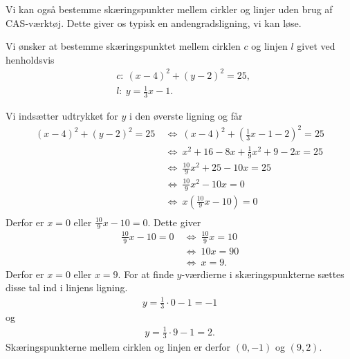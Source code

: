 \documentclass[12pt]{article}
\begin{document}
Vi kan også bestemme skæringspunkter mellem cirkler og linjer uden brug af CAS-værktøj. Dette giver os typisk en andengradsligning, vi kan løse.
\begin{exa}
	Vi ønsker at bestemme skæringspunktet mellem cirklen $c$ og linjen $l$ givet ved henholdsvis
	\begin{align*}
		&c: \ (x - 4)^2 + (y - 2)^2 = 25,\\
		&l: \ y = \frac{1}{3}x - 1.
	\end{align*}
\end{exa}
Vi indsætter udtrykket for $y$ i den øverste ligning og får
\begin{align*}
	(x-4)^2 + (y - 2)^2 = 25 \ &\Leftrightarrow \ (x-4)^2 + (\frac{1}{3}x-1-2)^2 = 25 \\
	&\Leftrightarrow \ x^2 + 16 - 8x + \frac{1}{9}x^2 + 9 - 2x = 25 \\
	&\Leftrightarrow \ \frac{10}{9}x^2 + 25 - 10x = 25 \\
	&\Leftrightarrow	\ \frac{10}{9}x^2 -10x = 0 \\
	&\Leftrightarrow \ x\left(\frac{10}{9}x - 10\right) = 0 \\
\end{align*}
Derfor er $x = 0$ eller $\frac{10}{9}x  - 10 = 0$. Dette giver
\begin{align*}
	\frac{10}{9}x - 10 = 0 \ &\Leftrightarrow \ \frac{10}{9}x = 10 \\
	&\Leftrightarrow	 \ 10x = 90 \\
	&\Leftrightarrow \ x = 9.
\end{align*} 
Derfor er $x = 0$ eller $x = 9$. For at finde $y$-værdierne i skæringspunkterne sættes disse tal ind i linjens ligning. 
\begin{align*}
	y = \frac{1}{3}\cdot 0 - 1 = -1
\end{align*}
og
\begin{align*}
	y = \frac{1}{3} \cdot 9 - 1 = 2.
\end{align*}
Skæringspunkterne mellem cirklen og linjen er derfor $(0,-1)$ og $(9,2)$. 
\end{document}
